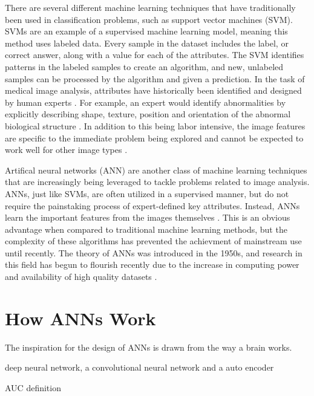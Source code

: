 \documentclass[sigconf]{acmart}
\begin{document}
There are several different machine learning techniques that have traditionally been used in classification problems, such as support vector machines (SVM). SVMs are an example of a supervised machine learning model, meaning this method uses labeled data. Every sample in the dataset includes the label, or correct answer, along with a value for each of the attributes. The SVM identifies patterns in the labeled samples to create an algorithm, and new, unlabeled samples can be processed by the algorithm and given a prediction. In the task of medical image analysis, attributes have historically been identified and designed by human experts \cite{cite06}. For example, an expert would identify abnormalities by explicitly describing shape, texture, position and orientation of the abnormal biological structure \cite{cite07}.  In addition to this being labor intensive, the image features are specific to the immediate problem being explored and cannot be expected to work well for other image types \cite{cite06}.

Artifical neural networks (ANN) are another class of machine learning techniques that are increasingly being leveraged to tackle problems related to image analysis. ANNs, just like SVMs, are often utilized in a supervised manner, but do not require the painstaking process of expert-defined key attributes. Instead, ANNs learn the important features from the images themselves \cite{cite07}. This is an obvious advantage when compared to traditional machine learning methods, but the complexity of these algorithms has prevented the achievment of mainstream use until recently. The theory of ANNs was introduced in the 1950s, and research in this field has begun to flourish recently due to the increase in computing power and availability of high quality datasets \cite{cite05}.

\section{How ANNs Work}

The inspiration for the design of ANNs is drawn from the way a brain works.

deep neural network, a convolutional neural network and a auto encoder

AUC definition
\end{document}

